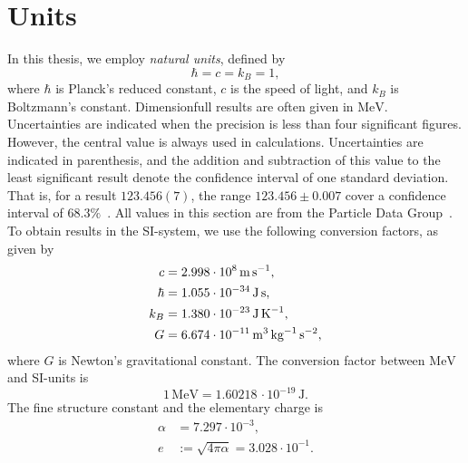 \section{Units}
\label{section: units}


In this thesis, we employ \emph{natural units}, defined by
%
\begin{equation}
    \hbar = c = k_B = 1,
\end{equation}
%
where $\hbar$ is Planck's reduced constant, $c$ is the speed of light, and $k_B$ is Boltzmann's constant.
Dimensionfull results are often given in $\text{MeV}$.
Uncertainties are indicated when the precision is less than four significant figures. 
However, the central value is always used in calculations.
Uncertainties are indicated in parenthesis, and the addition and subtraction of this value to the least significant result denote the confidence interval of one standard deviation.
That is, for a result $123.456(7)$, the range $123.456\pm0.007$ cover a confidence interval of $68.3\%$~\autocite{particledatagroupReviewParticlePhysics2020}.
All values in this section are from the Particle Data Group~\cite{particledatagroupReviewParticlePhysics2020}.
To obtain results in the SI-system, we use the following conversion factors, as given by
%
\begin{align}
    \label{speed of ligh}
    c       &= 2.998 \cdot 10^8     \, \text{m} \, \text{s}^{-1}, \\
    \label{hbar}
    \hbar   &= 1.055 \cdot 10^{-34} \, \text{J} \, \text{s}, \\
    \label{Boltzmanns constat}
    k_B     &= 1.380 \cdot 10^{-23} \, \text{J} \, \text K^{-1}, \\
    \label{Newtons gravitational constant}
    G       &= 6.674 \cdot 10^{-11} \, \text m^3 \, \text{kg}^{-1} \, \text s^{-2},
\end{align}
%
where $G$ is Newton's gravitational constant.
The conversion factor between $\text{MeV}$ and SI-units is
%
\begin{equation}
    \label{electronvolt}
    1 \, \text{MeV} = 1.60218\, \cdot 10^{-19} \, \text{J}. 
\end{equation}
%
The fine structure constant and the elementary charge is
%
\begin{align}
    \label{Fine structure constant}
    \alpha &= 7.297 \cdot 10^{-3}, \\
    \label{Elementary charge}
    e &:= \sqrt{4 \pi \alpha} =  3.028\cdot 10^{-1}.
\end{align}
